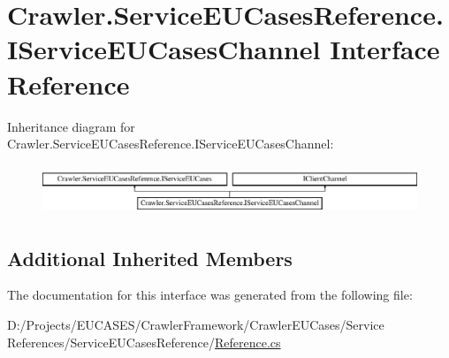 \hypertarget{interface_crawler_1_1_service_e_u_cases_reference_1_1_i_service_e_u_cases_channel}{\section{Crawler.\-Service\-E\-U\-Cases\-Reference.\-I\-Service\-E\-U\-Cases\-Channel Interface Reference}
\label{interface_crawler_1_1_service_e_u_cases_reference_1_1_i_service_e_u_cases_channel}
}
Inheritance diagram for Crawler.\-Service\-E\-U\-Cases\-Reference.\-I\-Service\-E\-U\-Cases\-Channel\-:\begin{figure}[H]
\begin{center}
\leavevmode
\includegraphics[height=1.505376cm]{interface_crawler_1_1_service_e_u_cases_reference_1_1_i_service_e_u_cases_channel}
\end{center}
\end{figure}
\subsection*{Additional Inherited Members}


The documentation for this interface was generated from the following file\-:\begin{DoxyCompactItemize}
\item 
D\-:/\-Projects/\-E\-U\-C\-A\-S\-E\-S/\-Crawler\-Framework/\-Crawler\-E\-U\-Cases/\-Service References/\-Service\-E\-U\-Cases\-Reference/\hyperlink{_reference_8cs}{Reference.\-cs}\end{DoxyCompactItemize}
